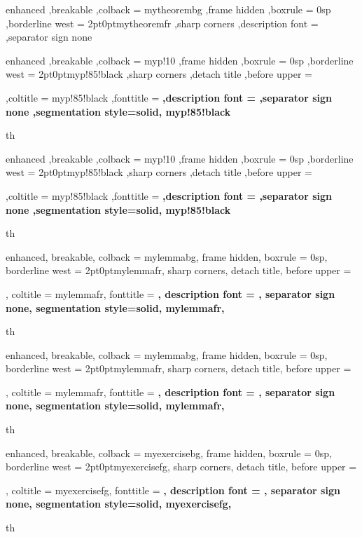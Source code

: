 {%
	enhanced
	,breakable
	,colback = mytheorembg
	,frame hidden
	,boxrule = 0sp
	,borderline west = {2pt}{0pt}{mytheoremfr}
	,sharp corners
	,description font = \mdseries
	,separator sign none
}

{%
	enhanced
	,breakable
	,colback = myp!10
	,frame hidden
	,boxrule = 0sp
	,borderline west = {2pt}{0pt}{myp!85!black}
	,sharp corners
	,detach title
	,before upper = \tcbtitle\par\smallskip
	,coltitle = myp!85!black
	,fonttitle = \bfseries\sffamily
	,description font = \mdseries
	,separator sign none
	,segmentation style={solid, myp!85!black}
}
{th}

{%
	enhanced
	,breakable
	,colback = myp!10
	,frame hidden
	,boxrule = 0sp
	,borderline west = {2pt}{0pt}{myp!85!black}
	,sharp corners
	,detach title
	,before upper = \tcbtitle\par\smallskip
	,coltitle = myp!85!black
	,fonttitle = \bfseries\sffamily
	,description font = \mdseries
	,separator sign none
	,segmentation style={solid, myp!85!black}
}
{th}

{%
	enhanced,
	breakable,
	colback = mylemmabg,
	frame hidden,
	boxrule = 0sp,
	borderline west = {2pt}{0pt}{mylemmafr},
	sharp corners,
	detach title,
	before upper = \tcbtitle\par\smallskip,
	coltitle = mylemmafr,
	fonttitle = \bfseries\sffamily,
	description font = \mdseries,
	separator sign none,
	segmentation style={solid, mylemmafr},
}
{th}

{%
	enhanced,
	breakable,
	colback = mylemmabg,
	frame hidden,
	boxrule = 0sp,
	borderline west = {2pt}{0pt}{mylemmafr},
	sharp corners,
	detach title,
	before upper = \tcbtitle\par\smallskip,
	coltitle = mylemmafr,
	fonttitle = \bfseries\sffamily,
	description font = \mdseries,
	separator sign none,
	segmentation style={solid, mylemmafr},
}
{th}

{%
	enhanced,
	breakable,
	colback = myexercisebg,
	frame hidden,
	boxrule = 0sp,
	borderline west = {2pt}{0pt}{myexercisefg},
	sharp corners,
	detach title,
	before upper = \tcbtitle\par\smallskip,
	coltitle = myexercisefg,
	fonttitle = \bfseries\sffamily,
	description font = \mdseries,
	separator sign none,
	segmentation style={solid, myexercisefg},
}
{th}

